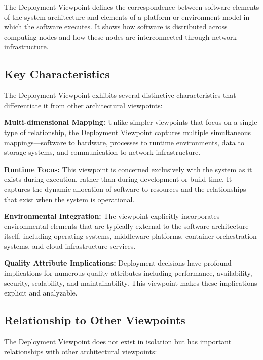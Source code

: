 \documentclass[11pt,letterpaper]{article}
\begin{document}
\begin{definitionbox}
The Deployment Viewpoint defines the correspondence between software elements of the system architecture and elements of a platform or environment model in which the software executes. It shows how software is distributed across computing nodes and how these nodes are interconnected through network infrastructure.
\end{definitionbox}

\subsection{Key Characteristics}

The Deployment Viewpoint exhibits several distinctive characteristics that differentiate it from other architectural viewpoints:

\textbf{Multi-dimensional Mapping:} Unlike simpler viewpoints that focus on a single type of relationship, the Deployment Viewpoint captures multiple simultaneous mappings---software to hardware, processes to runtime environments, data to storage systems, and communication to network infrastructure.

\textbf{Runtime Focus:} This viewpoint is concerned exclusively with the system as it exists during execution, rather than during development or build time. It captures the dynamic allocation of software to resources and the relationships that exist when the system is operational.

\textbf{Environmental Integration:} The viewpoint explicitly incorporates environmental elements that are typically external to the software architecture itself, including operating systems, middleware platforms, container orchestration systems, and cloud infrastructure services.

\textbf{Quality Attribute Implications:} Deployment decisions have profound implications for numerous quality attributes including performance, availability, security, scalability, and maintainability. This viewpoint makes these implications explicit and analyzable.

\subsection{Relationship to Other Viewpoints}

The Deployment Viewpoint does not exist in isolation but has important relationships with other architectural viewpoints:
\end{document}
